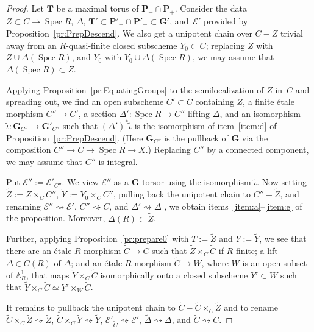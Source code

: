 \documentclass[11pt]{amsart}
\newcommand\A{\mathbb A}
\DeclareMathOperator\Spec{{Spec}}
\theoremstyle{plain}
\theoremstyle{definition}
\theoremstyle{remark}
\newcommand\cE{{\mathcal{E}}}
\newcommand\bT{{\mathbf T}}
\newcommand\bG{{\mathbf G}}
\newcommand\bP{{\mathbf P}}
\begin{document}
\begin{proof}
Let $\bT$ be a maximal torus of $\bP_-\cap\bP_+$. Consider the data $Z\subset C\to\Spec R$, $\Delta$, $\bT'\subset\bP'_-\cap\bP'_+\subset\bG'$, and~$\cE'$ provided by Proposition~\ref{pr:PrepDescend}. We also get a unipotent chain over $C-Z$ trivial away from an $R$-quasi-finite closed subscheme $Y_0\subset C$; replacing $Z$ with $Z\cup\Delta(\Spec R)$, and $Y_0$ with $Y_0\cup\Delta(\Spec R)$, we may assume that $\Delta(\Spec R)\subset Z$.

Applying Proposition~\ref{pr:EquatingGroups} to the semilocalization of $Z$ in~$C$ and spreading out, we find an open subscheme $C'\subset C$ containing $Z$, a finite \'etale morphism $C''\to C'$, a section $\Delta'\colon\Spec R\to C''$ lifting $\Delta$, and an isomorphism $\tilde\iota\colon\bG_{C''}\to\bG'_{C''}$ such that $(\Delta')^*\tilde\iota$ is the isomorphism of item~\eqref{item:d} of Proposition~\ref{pr:PrepDescend}. (Here $\bG_{C''}$ is the pullback of $\bG$ via the composition $C''\to C\to\Spec R\to X$.) Replacing $C''$ by a connected component, we may assume that $C''$ is integral.

Put $\cE'':=\cE'_{C''}$. We view $\cE''$ as a $\bG$-torsor using the isomorphism $\tilde\iota$. Now setting $\widetilde Z:=Z\times_CC''$, $\widetilde Y:=Y_0\times_CC''$, pulling back the unipotent chain to $C''-\widetilde Z$, and renaming $\cE''\rightsquigarrow\cE'$, $C''\rightsquigarrow C$, and $\Delta'\rightsquigarrow\Delta$ , we obtain items~\eqref{item:a}--\eqref{item:e} of the proposition. Moreover, $\Delta(R)\subset\widetilde Z$.

Further, applying Proposition~\ref{pr:prepare0} with $T:=\widetilde Z$ and $Y:=\widetilde Y$, we see that there are an \'etale $R$-morphism $\widetilde C\to C$ such that $\widetilde Z\times_C\widetilde C$ if $R$-finite; a lift $\widetilde\Delta\in\widetilde C(R)$ of $\Delta$; and an \'etale $R$-morphism $\widetilde C\to W$, where $W$ is an open subset of $\A^1_R$, that maps $\widetilde Y\times_C\widetilde C$ isomorphically onto a closed subscheme $Y'\subset W$ such that $\widetilde Y\times_C\widetilde C\simeq Y'\times_W\widetilde C$.

It remains to pullback the unipotent chain to $\widetilde C-\widetilde C\times_C\widetilde Z$ and to rename $\widetilde C\times_C\widetilde Z\rightsquigarrow\widetilde Z$, $\widetilde C\times_C\widetilde Y\rightsquigarrow\widetilde Y$,
$\cE'_{\widetilde C}\rightsquigarrow\cE'$, $\widetilde\Delta\rightsquigarrow\Delta$, and
$\widetilde C\rightsquigarrow C$.
\end{proof}
\end{document}
